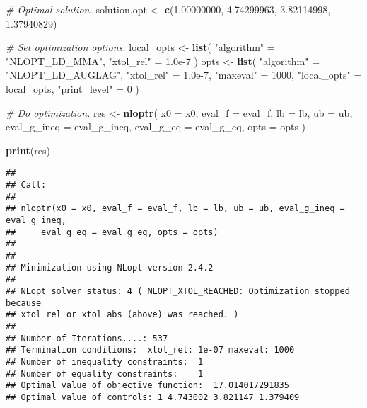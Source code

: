 \documentclass[onecolumn]{article}
\newenvironment{Shaded}{\begin{snugshade}}{\end{snugshade}}
\newcommand{\KeywordTok}[1]{\textcolor[rgb]{0.13,0.29,0.53}{\textbf{#1}}}
\newcommand{\DataTypeTok}[1]{\textcolor[rgb]{0.13,0.29,0.53}{#1}}
\newcommand{\DecValTok}[1]{\textcolor[rgb]{0.00,0.00,0.81}{#1}}
\newcommand{\FloatTok}[1]{\textcolor[rgb]{0.00,0.00,0.81}{#1}}
\newcommand{\StringTok}[1]{\textcolor[rgb]{0.31,0.60,0.02}{#1}}
\newcommand{\CommentTok}[1]{\textcolor[rgb]{0.56,0.35,0.01}{\textit{#1}}}
\newcommand{\NormalTok}[1]{#1}
\begin{document}
\begin{Shaded}
\begin{Highlighting}[]
    \CommentTok{# Optimal solution.}
\NormalTok{    solution.opt <-}\StringTok{ }\KeywordTok{c}\NormalTok{(}\FloatTok{1.00000000}\NormalTok{, }\FloatTok{4.74299963}\NormalTok{, }\FloatTok{3.82114998}\NormalTok{, }\FloatTok{1.37940829}\NormalTok{)}

    \CommentTok{# Set optimization options.}
\NormalTok{    local_opts <-}\StringTok{ }\KeywordTok{list}\NormalTok{( }\StringTok{"algorithm"}\NormalTok{ =}\StringTok{ "NLOPT_LD_MMA"}\NormalTok{,}
                        \StringTok{"xtol_rel"}\NormalTok{  =}\StringTok{ }\FloatTok{1.0e-7}\NormalTok{ )}
\NormalTok{    opts <-}\StringTok{ }\KeywordTok{list}\NormalTok{( }\StringTok{"algorithm"}\NormalTok{   =}\StringTok{ "NLOPT_LD_AUGLAG"}\NormalTok{,}
                  \StringTok{"xtol_rel"}\NormalTok{    =}\StringTok{ }\FloatTok{1.0e-7}\NormalTok{,}
                  \StringTok{"maxeval"}\NormalTok{     =}\StringTok{ }\DecValTok{1000}\NormalTok{,}
                  \StringTok{"local_opts"}\NormalTok{  =}\StringTok{ }\NormalTok{local_opts,}
                  \StringTok{"print_level"}\NormalTok{ =}\StringTok{ }\DecValTok{0}\NormalTok{ )}

    \CommentTok{# Do optimization.}
\NormalTok{    res <-}\StringTok{ }\KeywordTok{nloptr}\NormalTok{( }\DataTypeTok{x0          =}\NormalTok{ x0,}
                   \DataTypeTok{eval_f      =}\NormalTok{ eval_f,}
                   \DataTypeTok{lb          =}\NormalTok{ lb,}
                   \DataTypeTok{ub          =}\NormalTok{ ub,}
                   \DataTypeTok{eval_g_ineq =}\NormalTok{ eval_g_ineq,}
                   \DataTypeTok{eval_g_eq   =}\NormalTok{ eval_g_eq,}
                   \DataTypeTok{opts        =}\NormalTok{ opts )}

\KeywordTok{print}\NormalTok{(res)}
\end{Highlighting}
\end{Shaded}

\begin{verbatim}
## 
## Call:
## 
## nloptr(x0 = x0, eval_f = eval_f, lb = lb, ub = ub, eval_g_ineq = eval_g_ineq, 
##     eval_g_eq = eval_g_eq, opts = opts)
## 
## 
## Minimization using NLopt version 2.4.2 
## 
## NLopt solver status: 4 ( NLOPT_XTOL_REACHED: Optimization stopped because 
## xtol_rel or xtol_abs (above) was reached. )
## 
## Number of Iterations....: 537 
## Termination conditions:  xtol_rel: 1e-07 maxeval: 1000 
## Number of inequality constraints:  1 
## Number of equality constraints:    1 
## Optimal value of objective function:  17.014017291835 
## Optimal value of controls: 1 4.743002 3.821147 1.379409
\end{verbatim}
\end{document}
